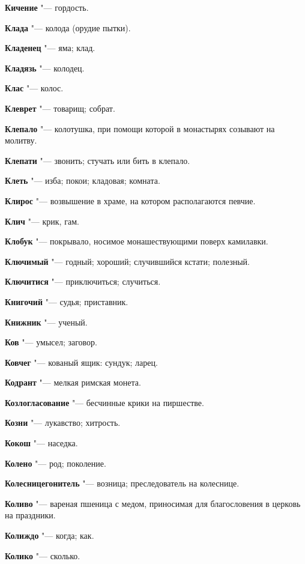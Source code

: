\begin{mymulticols}
\noindent\textbf{Кичение} "--- гордость. 

\noindent\textbf{Клада} "--- колода (орудие пытки). 

\noindent\textbf{Кладенец} "--- яма; клад. 

\noindent\textbf{Кладязь} "--- колодец. 

\noindent\textbf{Клас} "--- колос. 

\noindent\textbf{Клеврет} "--- товарищ; собрат. 

\noindent\textbf{Клепало} "--- колотушка, при помощи которой в монастырях созывают на молитву. 

\noindent\textbf{Клепати} "--- звонить; стучать или бить в клепало. 

\noindent\textbf{Клеть} "--- изба; покои; кладовая; комната. 

\noindent\textbf{Клирос} "--- возвышение в храме, на котором располагаются певчие. 

\noindent\textbf{Клич} "--- крик, гам. 

\noindent\textbf{Клобук} "--- покрывало, носимое монашествующими поверх камилавки. 

\noindent\textbf{Ключимый} "--- годный; хороший; случившийся кстати; полезный. 

\noindent\textbf{Ключитися} "--- приключиться; случиться. 

\noindent\textbf{Книгочий} "--- судья; приставник. 

\noindent\textbf{Книжник} "--- ученый. 

\noindent\textbf{Ков} "--- умысел; заговор. 

\noindent\textbf{Ковчег} "--- кованый ящик: сундук; ларец. 

\noindent\textbf{Кодрант} "--- мелкая римская монета. 

\noindent\textbf{Козлогласование} "--- бесчинные крики на пиршестве. 

\noindent\textbf{Козни} "--- лукавство; хитрость. 

\noindent\textbf{Кокош} "--- наседка. 

\noindent\textbf{Колено} "--- род; поколение. 

\noindent\textbf{Колесницегонитель} "--- возница; преследователь на колеснице. 

\noindent\textbf{Коливо} "--- вареная пшеница с медом, приносимая для благословения в церковь на праздники. 

\noindent\textbf{Колиждо} "--- когда; как. 

\noindent\textbf{Колико} "--- сколько. 


\end{mymulticols}
